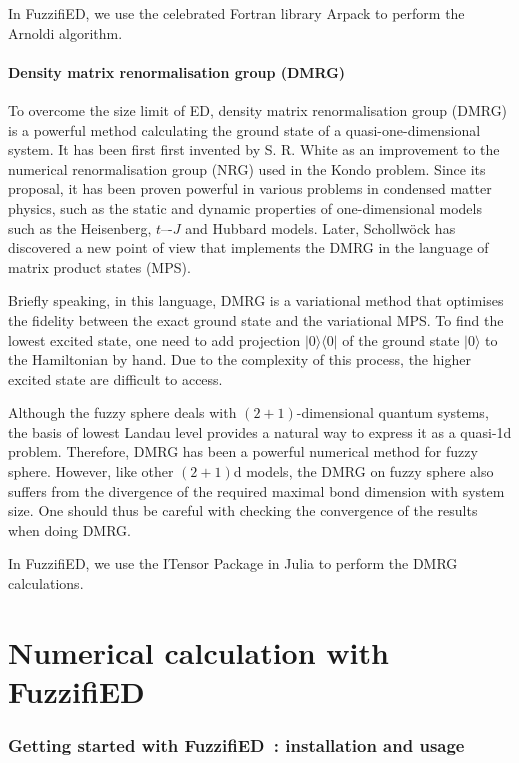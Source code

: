 \documentclass{timesjhep}
\begin{document}
In FuzzifiED, we use the celebrated Fortran library Arpack to perform the Arnoldi algorithm. 

\subsection{Density matrix renormalisation group (DMRG)}

To overcome the size limit of ED, density matrix renormalisation group (DMRG) is a powerful method calculating the ground state of a quasi-one-dimensional system. It has been first first invented by S. R. White as an improvement to the numerical renormalisation group (NRG) used in the Kondo problem. Since its proposal, it has been proven powerful in various problems in condensed matter physics, such as the static and dynamic properties of one-dimensional models such as the Heisenberg, $t$–-$J$ and Hubbard models. Later, Schollw\"ock has discovered a new point of view that implements the DMRG in the language of matrix product states (MPS). 

Briefly speaking, in this language, DMRG is a variational method that optimises the fidelity between the exact ground state and the variational MPS. To find the lowest excited state, one need to add projection $|0\rangle\langle 0|$ of the ground state $|0\rangle$ to the Hamiltonian by hand. Due to the complexity of this process, the higher excited state are difficult to access.

Although the fuzzy sphere deals with $(2+1)$-dimensional quantum systems, the basis of lowest Landau level provides a natural way to express it as a quasi-1d problem. Therefore, DMRG has been a powerful numerical method for fuzzy sphere. However, like other $(2+1)$d models, the DMRG on fuzzy sphere also suffers from the divergence of the required maximal bond dimension with system size. One should thus be careful with checking the convergence of the results when doing DMRG. 

In FuzzifiED, we use the ITensor Package in Julia to perform the DMRG calculations. 

\clearpage
\part{Numerical calculation with FuzzifiED}
\label{pt:numerics}

\section{Getting started with FuzzifiED~: installation and usage}
\label{sec:usage}
\end{document}
